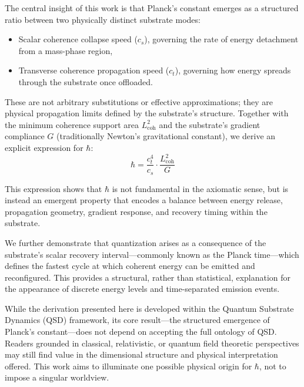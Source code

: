 \documentclass[ht-mathphys]{ht-fmt}
\theoremstyle{thmstyleone}%
\theoremstyle{thmstyletwo}%
\theoremstyle{thmstylethree}%
\begin{document}
The central insight of this work is that Planck’s constant emerges as a structured ratio between two physically distinct substrate modes:
\begin{itemize}
    \item Scalar coherence collapse speed ($c_s$), governing the rate of energy detachment from a mass-phase region,
    \item Transverse coherence propagation speed ($c_t$), governing how energy spreads through the substrate once offloaded.
\end{itemize}

These are not arbitrary substitutions or effective approximations; they are physical propagation limits defined by the substrate's structure. Together with the minimum coherence support area $L_{\text{coh}}^2$ and the substrate's gradient compliance $G$ (traditionally Newton’s gravitational constant), we derive an explicit expression for $\hbar$:
\[
\hbar = \frac{c_t^4}{c_s} \cdot \frac{L_{\text{coh}}^2}{G}
\]

This expression shows that $\hbar$ is not fundamental in the axiomatic sense, but is instead an emergent property that encodes a balance between energy release, propagation geometry, gradient response, and recovery timing within the substrate.

We further demonstrate that quantization arises as a consequence of the substrate’s scalar recovery interval—commonly known as the Planck time—which defines the fastest cycle at which coherent energy can be emitted and reconfigured. This provides a structural, rather than statistical, explanation for the appearance of discrete energy levels and time-separated emission events.

While the derivation presented here is developed within the Quantum Substrate Dynamics (QSD) framework, its core result—the structured emergence of Planck’s constant—does not depend on accepting the full ontology of QSD. Readers grounded in classical, relativistic, or quantum field theoretic perspectives may still find value in the dimensional structure and physical interpretation offered. This work aims to illuminate one possible physical origin for $\hbar$, not to impose a singular worldview.
\end{document}
